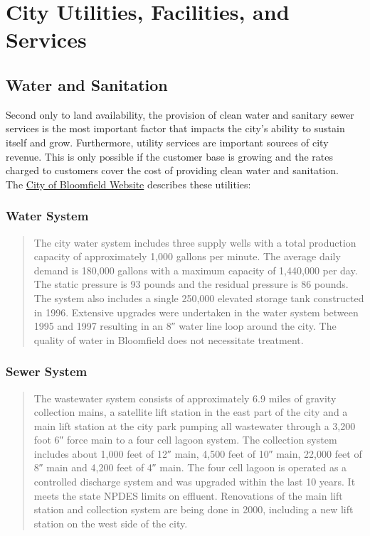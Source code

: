 \section{City Utilities, Facilities, and Services}

\subsection{Water and Sanitation}

\noindent Second only to land availability, the provision of clean water and sanitary sewer services is the most important factor that impacts the city's ability to sustain itself and grow. Furthermore, utility services are important sources of city revenue. This is only possible if the customer base is growing and the rates charged to customers cover the cost of providing clean water and sanitation.\\

\noindent The \href{https://bloomfieldnebraska.com/government/}{City of Bloomfield Website} describes these utilities:

\subsubsection*{Water System}
\begin{quote}
    The city water system includes three supply wells with a total production capacity of approximately 1,000 gallons per minute. The average daily demand is 180,000 gallons with a maximum capacity of 1,440,000 per day. The static pressure is 93 pounds and the residual pressure is 86 pounds. The system also includes a single 250,000 elevated storage tank constructed in 1996. Extensive upgrades were undertaken in the water system between 1995 and 1997 resulting in an 8″ water line loop around the city. The quality of water in Bloomfield does not necessitate treatment.
\end{quote}

\subsubsection*{Sewer System}
\begin{quote}
    The wastewater system consists of approximately 6.9 miles of gravity collection mains, a satellite lift station in the east part of the city and a main lift station at the city park pumping all wastewater through a 3,200 foot 6″ force main to a four cell lagoon system. The collection system includes about 1,000 feet of 12″ main, 4,500 feet of 10″ main, 22,000 feet of 8″ main and 4,200 feet of 4″ main. The four cell lagoon is operated as a controlled discharge system and was upgraded within the last 10 years. It meets the state NPDES limits on effluent. Renovations of the main lift station and collection system are being done in 2000, including a new lift station on the west side of the city.
\end{quote}

